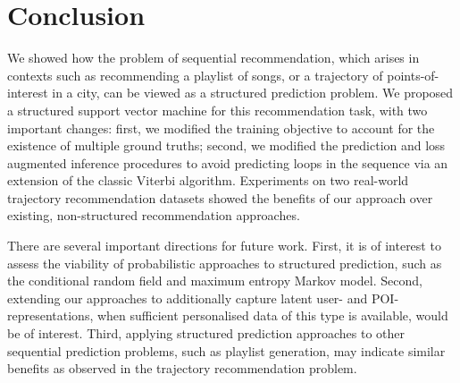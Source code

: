 
\secmoveup
\section{Conclusion}
\textmoveup

We showed how the problem of sequential recommendation,
which arises in contexts such as
recommending a playlist of songs, or a trajectory of points-of-interest in a city,
can be viewed as a structured prediction problem.
We proposed a structured support vector machine for this recommendation task, with two important changes:
first, we modified the training objective to account for the existence of multiple ground truths;
second, we modified the prediction and loss augmented inference procedures to avoid predicting loops in the sequence via an extension of the classic Viterbi algorithm.
Experiments on two real-world trajectory recommendation datasets showed the benefits of our approach over existing, non-structured recommendation approaches.

There are several important directions for future work.
First, it is of interest to assess the viability of probabilistic approaches to structured prediction,
such as the conditional random field and maximum entropy Markov model.
Second, extending our approaches to additionally capture latent user- and POI-representations, when sufficient personalised data of this type is available, would be of interest.
Third, applying structured prediction approaches to other sequential prediction problems, such as playlist generation, may indicate similar benefits as observed in the trajectory recommendation problem.
